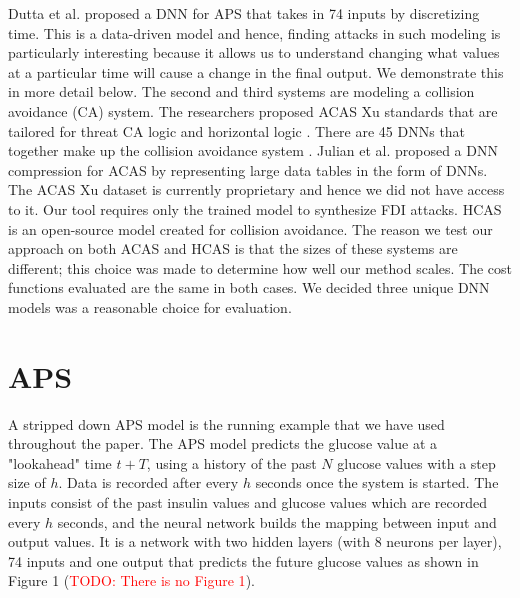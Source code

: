 Dutta et al. \cite{10.1007/978-3-319-99429-1_11} proposed a DNN for APS that takes in 74 inputs by discretizing time. This is a data-driven model and hence, finding attacks in such modeling is particularly interesting because it allows us to understand changing what values at a particular time will cause a change in the final output. We demonstrate this in more detail below. The second and third systems are modeling a collision avoidance (CA) system. The researchers proposed ACAS Xu standards that are tailored for threat CA logic and horizontal logic \cite{7778055}. There are 45 DNNs that together make up the collision avoidance system \cite{Julian_2019}.  Julian et al. proposed a DNN compression for ACAS by representing large data tables in the form of DNNs. The ACAS Xu dataset is currently proprietary and hence we did not have access to it. Our tool requires only the trained model to synthesize FDI attacks. HCAS is an open-source model created for collision avoidance. The reason we test our approach on both ACAS and HCAS is that the sizes of these systems are different; this choice was made to determine how well our method scales. The cost functions evaluated are the same in both cases. We decided three unique DNN models was a reasonable choice for evaluation.

\section{APS}
A stripped down APS model is the running example that we have used throughout the paper. 
The APS model predicts the glucose value at a "lookahead" time $t + T$, using a history of the past $N$ glucose values with a step size of $h$. Data is recorded after every $h$ seconds once the system is started. The inputs consist of the past insulin values and glucose values which are recorded every $h$ seconds, and the neural network builds the mapping between input and output values. It is a network with two hidden layers (with 8 neurons per layer), 74 inputs and one output that predicts the future glucose values as shown in Figure 1 (\textcolor{red}{TODO: There is no Figure 1}).


